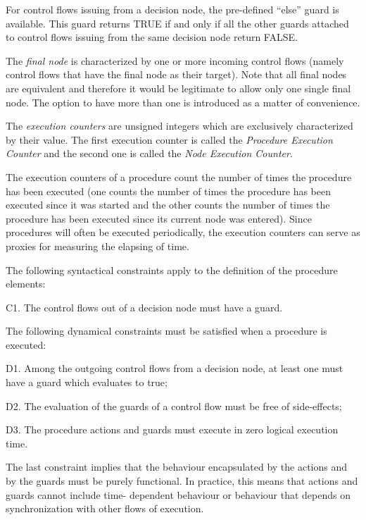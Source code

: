 \documentclass[a4paper,10pt]{article}
\newenvironment{fw_itemize}						%
{\begin{itemize}
  \setlength{\itemsep}{1mm}
  \setlength{\parskip}{0pt}
  \setlength{\parsep}{0pt}}
{\end{itemize}}
\begin{document}
For control flows issuing from a decision node, the pre-defined “else” guard is available. This
guard returns TRUE if and only if all the other guards attached to control flows issuing from
the same decision node return FALSE.

The \emph{final node} is characterized by one or more incoming control flows (namely control flows
that have the final node as their target). Note that all final nodes are equivalent and therefore it
would be legitimate to allow only one single final node. The option to have more than one is
introduced as a matter of convenience.

The \emph{execution counters} are unsigned integers which are exclusively characterized by their value. The first execution counter is called the \emph{Procedure Execution Counter} and the second one is called the \emph{Node Execution Counter}.

The execution counters of a procedure count the number of times the procedure has
been executed (one counts the number of times the procedure has been executed since it 
was started and the other counts the number of times the procedure has been executed
since its current node was entered). Since procedures will often be executed periodically,
the execution counters can serve as proxies for measuring the elapsing of time.

The following syntactical constraints apply to the definition of the procedure elements:

\begin{fw_itemize} 
\item C1. The control flows out of a decision node must have a guard.
\end{fw_itemize}

The following dynamical constraints must be satisfied when a procedure is executed:
\begin{fw_itemize} 
\item D1. Among the outgoing control flows from a decision node, at least one must have a
guard which evaluates to true;
\item D2. The evaluation of the guards of a control flow must be free of side-effects;
\item D3. The procedure actions and guards must execute in zero logical execution time.
\end{fw_itemize}

The last constraint implies that the behaviour encapsulated by the actions and by the guards
must be purely functional. In practice, this means that actions and guards cannot include time-
dependent behaviour or behaviour that depends on synchronization with other flows of
execution.
\end{document}
